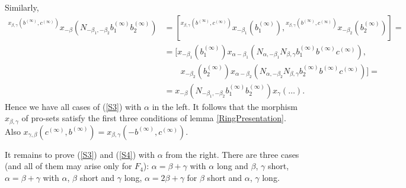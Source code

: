 \documentclass{article}
\numberwithin{equation}{section}
\theoremstyle{definition}
\theoremstyle{remark}
\newcommand{\up}[2]{{^{#1}\!{#2}}}
\begin{document}
 Similarly,
 \begin{align*}
  \up{x_{\beta, \gamma}(b^{(\infty)}, c^{(\infty)})}
   {x_{-\beta}(N_{-\beta_1, -\beta_2} b_1^{(\infty)} b_2^{(\infty)})}
  &= [\up{x_{\beta, \gamma}(b^{(\infty)}, c^{(\infty)})}
   {x_{-\beta_1}(b_1^{(\infty)})},
  \up{x_{\beta, \gamma}(b^{(\infty)}, c^{(\infty)})}
   {x_{-\beta_2}(b_2^{(\infty)})}] =\\
  &= [x_{-\beta_1}(b_1^{(\infty)})
   x_{\alpha - \beta_1}(N_{\alpha, -\beta_1} N_{\beta, \gamma}
   b_1^{(\infty)} b^{(\infty)} c^{(\infty)}),\\
  &\qquad x_{-\beta_2}(b_2^{(\infty)})
   x_{\alpha - \beta_2}(N_{\alpha, -\beta_2} N_{\beta, \gamma}
   b_2^{(\infty)} b^{(\infty)} c^{(\infty)})] =\\
  &= x_{-\beta}(N_{-\beta_1, -\beta_2}
   b_1^{(\infty)} b_2^{(\infty)})
   x_\gamma(\ldots).
 \end{align*}
 Hence we have all cases of (\ref{S3}) with \(\alpha\) in the left. It follows that the morphism \(x_{\beta, \gamma}\) of pro-sets satisfy the first three conditions of lemma \ref{RingPresentation}. Also \(x_{\gamma, \beta}(c^{(\infty)}, b^{(\infty)}) = x_{\beta, \gamma}(-b^{(\infty)}, c^{(\infty)})\).

 It remains to prove (\ref{S3}) and (\ref{S4}) with \(\alpha\) from the right. There are three cases (and all of them may arise only for \(F_4\)): \(\alpha = \beta + \gamma\) with \(\alpha\) long and \(\beta\), \(\gamma\) short, \(\alpha = \beta + \gamma\) with \(\alpha\), \(\beta\) short and \(\gamma\) long, \(\alpha = 2\beta + \gamma\) for \(\beta\) short and \(\alpha\), \(\gamma\) long.
\end{document}

